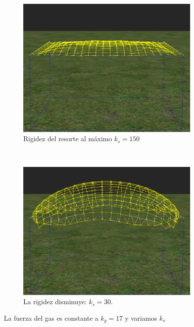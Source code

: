 \begin{figure}
 \centering
  \begin{subfigure}[b]{0.45\textwidth}
    \includegraphics[width=\textwidth]{img/04/maxRes1}
    \caption{Rigidez del resorte al máximo $k_s=150$}
    \label{fig:maxRes1}
  \end{subfigure}
~
  \begin{subfigure}[b]{0.45\textwidth}
    \includegraphics[width=\textwidth]{img/04/maxRes2}
    \caption{La rigidez disminuye: $k_s=30$.}
    \label{fig:maxRes2}
  \end{subfigure}
 \caption[Experimento: Fuerza del resorte]{La fuerza del gas es constante a $k_g=17$ y variamos $k_s$} 
 \label{fig:maxRes}
\end{figure}

